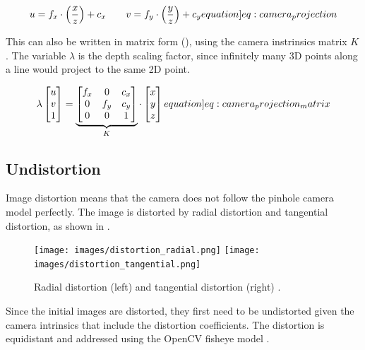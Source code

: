 \begin{equation}
    u = f_x \cdot \Big(\frac{x}{z}\Big) + c_x
    \qquad
    v = f_y \cdot \Big(\frac{y}{z}\Big) + c_y
    \label[equation]{eq:camera_projection}
\end{equation}

This can also be written in matrix form (), using the camera instrinsics matrix $K$. The variable $\lambda$ is the depth scaling factor, since infinitely many 3D points along a line would project to the same 2D point.

\begin{equation}
    \lambda \begin{bmatrix} u \\ v \\ 1 \end{bmatrix} = \underbrace{\begin{bmatrix} f_x & 0 & c_x\\ 0 & f_y & c_y \\ 0 & 0 & 1 \end{bmatrix}}_K \cdot \begin{bmatrix} x \\ y \\ z \end{bmatrix}
    \label[equation]{eq:camera_projection_matrix}
\end{equation}

\subsection{Undistortion}
\label{subsec:undistortion}

Image distortion means that the camera does not follow the pinhole camera model perfectly. The image is distorted by radial distortion and tangential distortion, as shown in .

\begin{figure}[h]
    \centering
    \texttt{[image: images/distortion\_radial.png]}
    \hspace{0.1\textwidth}
    \texttt{[image: images/distortion\_tangential.png]}
    \caption{Radial distortion (left) and tangential distortion (right) \cite{weng1992camera}.}
    \label{fig:radial_tangential_distortion}
\end{figure}

Since the initial images are distorted, they first need to be undistorted given the camera intrinsics that include the distortion coefficients. %
The distortion is equidistant and addressed using the OpenCV fisheye model \cite{opencv-fisheye}. %

